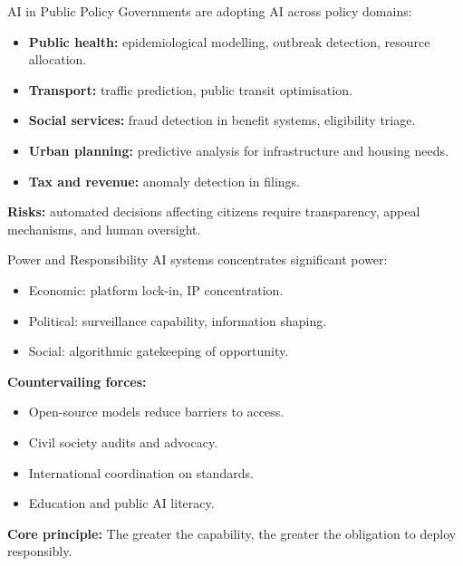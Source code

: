 \documentclass[10pt]{beamer}
\begin{document}
\begin{frame}{AI in Public Policy}
    Governments are adopting AI across policy domains:
    \begin{itemize}
        \item \textbf{Public health:} epidemiological modelling, outbreak detection, resource allocation.
        \item \textbf{Transport:} traffic prediction, public transit optimisation.
        \item \textbf{Social services:} fraud detection in benefit systems, eligibility triage.
        \item \textbf{Urban planning:} predictive analysis for infrastructure and housing needs.
        \item \textbf{Tax and revenue:} anomaly detection in filings.
    \end{itemize}

    \vspace{0.2cm}
    \textbf{Risks:} automated decisions affecting citizens require transparency, appeal mechanisms, and human oversight.
\end{frame}

\begin{frame}{Power and Responsibility}
    AI systems concentrates significant power:
    \begin{itemize}
        \item Economic: platform lock-in, IP concentration.
        \item Political: surveillance capability, information shaping.
        \item Social: algorithmic gatekeeping of opportunity.
    \end{itemize}

    \vspace{0.2cm}
    \textbf{Countervailing forces:}
    \begin{itemize}
        \item Open-source models reduce barriers to access.
        \item Civil society audits and advocacy.
        \item International coordination on standards.
        \item Education and public AI literacy.
    \end{itemize}

    \vspace{0.15cm}
    \textbf{Core principle:} The greater the capability, the greater the obligation to deploy responsibly.
\end{frame}
\end{document}
